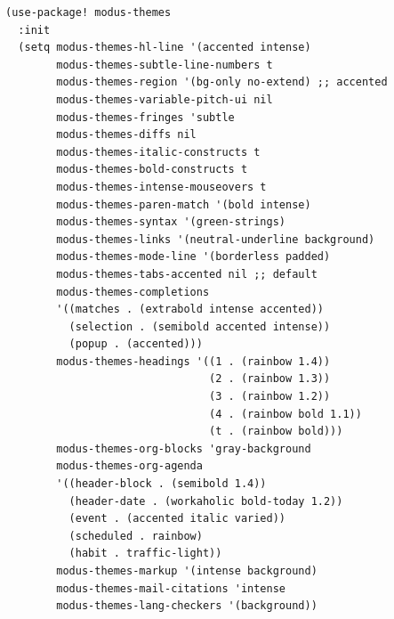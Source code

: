 \documentclass[11pt]{article}
\begin{document}
\begin{verbatim}
(use-package! modus-themes
  :init
  (setq modus-themes-hl-line '(accented intense)
        modus-themes-subtle-line-numbers t
        modus-themes-region '(bg-only no-extend) ;; accented
        modus-themes-variable-pitch-ui nil
        modus-themes-fringes 'subtle
        modus-themes-diffs nil
        modus-themes-italic-constructs t
        modus-themes-bold-constructs t
        modus-themes-intense-mouseovers t
        modus-themes-paren-match '(bold intense)
        modus-themes-syntax '(green-strings)
        modus-themes-links '(neutral-underline background)
        modus-themes-mode-line '(borderless padded)
        modus-themes-tabs-accented nil ;; default
        modus-themes-completions
        '((matches . (extrabold intense accented))
          (selection . (semibold accented intense))
          (popup . (accented)))
        modus-themes-headings '((1 . (rainbow 1.4))
                                (2 . (rainbow 1.3))
                                (3 . (rainbow 1.2))
                                (4 . (rainbow bold 1.1))
                                (t . (rainbow bold)))
        modus-themes-org-blocks 'gray-background
        modus-themes-org-agenda
        '((header-block . (semibold 1.4))
          (header-date . (workaholic bold-today 1.2))
          (event . (accented italic varied))
          (scheduled . rainbow)
          (habit . traffic-light))
        modus-themes-markup '(intense background)
        modus-themes-mail-citations 'intense
        modus-themes-lang-checkers '(background))


\end{verbatim}
\end{document}
